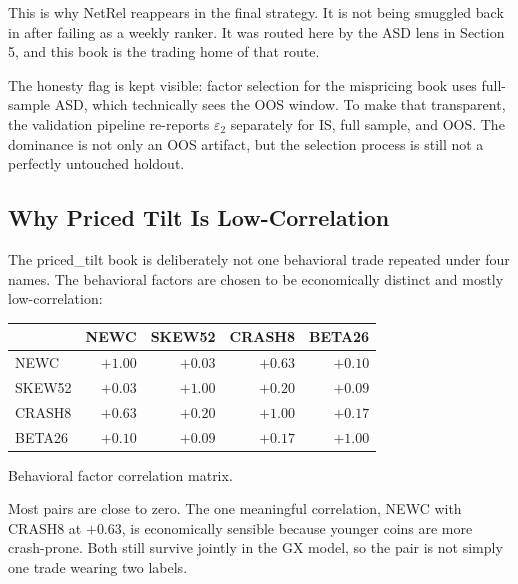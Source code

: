 \documentclass[11pt,a4paper]{article}
\begin{document}
This is why NetRel reappears in the final strategy. It is not being smuggled back in after failing as a weekly ranker. It was routed here by the ASD lens in Section\,5, and this book is the trading home of that route.

The honesty flag is kept visible: factor selection for the mispricing book uses full-sample ASD, which technically sees the OOS window. To make that transparent, the validation pipeline re-reports $\varepsilon_2$ separately for IS, full sample, and OOS. The dominance is not only an OOS artifact, but the selection process is still not a perfectly untouched holdout.

\subsection{Why Priced Tilt Is Low-Correlation}

The priced\_tilt book is deliberately not one behavioral trade repeated under four names. The behavioral factors are chosen to be economically distinct and mostly low-correlation:

\begin{center}
\small
\begin{tabular}{lrrrr}
\toprule
\rowcolor{tablehead}
 & \textbf{NEWC} & \textbf{SKEW52} & \textbf{CRASH8} & \textbf{BETA26} \\
\midrule
NEWC   & $+1.00$ & $+0.03$ & $+0.63$ & $+0.10$ \\
SKEW52 & $+0.03$ & $+1.00$ & $+0.20$ & $+0.09$ \\
CRASH8 & $+0.63$ & $+0.20$ & $+1.00$ & $+0.17$ \\
BETA26 & $+0.10$ & $+0.09$ & $+0.17$ & $+1.00$ \\
\bottomrule
\end{tabular}
\end{center}
\smallskip
{\small Behavioral factor correlation matrix.}

Most pairs are close to zero. The one meaningful correlation, NEWC with CRASH8 at $+0.63$, is economically sensible because younger coins are more crash-prone. Both still survive jointly in the GX model, so the pair is not simply one trade wearing two labels.
\end{document}
